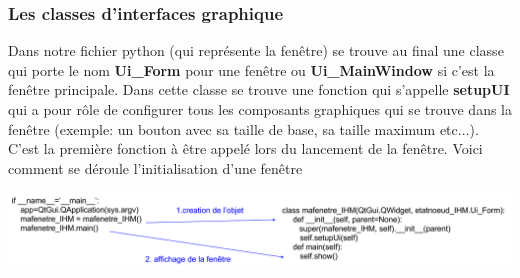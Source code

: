 \documentclass[a4paper,11pt]{article}
\begin{document}
\subsubsection{Les classes d'interfaces graphique}
Dans notre fichier python (qui représente la fenêtre) se trouve au final une classe qui porte le nom \textbf{Ui\_Form} pour une fenêtre ou \textbf{Ui\_MainWindow} si c'est la fenêtre principale. Dans cette classe se trouve une fonction qui s'appelle \textbf{setupUI} qui a pour rôle de configurer tous les composants graphiques qui se trouve dans la fenêtre (exemple: un bouton avec sa taille de base, sa taille maximum etc...). C'est la première fonction à être appelé lors du lancement de la fenêtre.
\linebreak
Voici comment se déroule l'initialisation d'une fenêtre
\begin{center}
\includegraphics[scale=0.45]{initialisation_fenetre.jpg} 
\end{center}
\end{document}
